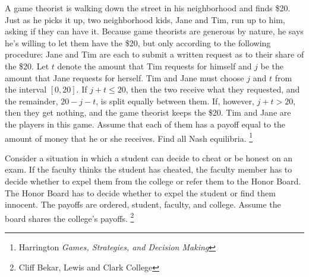 \documentclass[addpoints ]{exam}
\begin{document}
\begin{questions}
\question[10] 
A game theorist is walking down the street in his neighborhood and finds \$20.
Just as he picks it up, two neighborhood kids, 
Jane and Tim,
run up to him, asking if they can have it.
Because game theorists are generous by nature, 
he says he's willing to let them have the \$20,
but only according to the following procedure:
Jane and Tim are each to submit a written request 
as to their share of the \$20. 
Let $t$ denote the amount that Tim requests for himself
and $j$ be the amount that Jane requests for herself.
Tim and Jane must choose $j$ and $t$ from the interval
$[0,20]$.
If $j + t \leq 20$, then the two receive what they requested,
and the remainder, $20 - j - t$, is split equally between them.
If, however, $j + t > 20$, then they get nothing, and the game theorist keeps the \$20.
Tim and Jane are the players in this game.
Assume that each of them has a payoff equal to the amount of money that he or she receives. 
Find all Nash equilibria.
\footnote{Harrington \textit{Games, Strategies, and Decision Making}}


\newpage


\question 

Consider a situation in which a student can decide to cheat or be honest on an exam.
If the faculty thinks the student has cheated, 
the faculty member has to decide whether to expel them from the college
or refer them to the Honor Board. 
The Honor Board has to decide whether to expel the student or find them innocent.
The payoffs are ordered, student, faculty, and college.
Assume the board shares the college's payoffs. 
\footnote{Cliff Bekar, Lewis and Clark College}

\begin{figure}[!h]
  \centering
  
\end{figure}

\end{questions}
\end{document}
